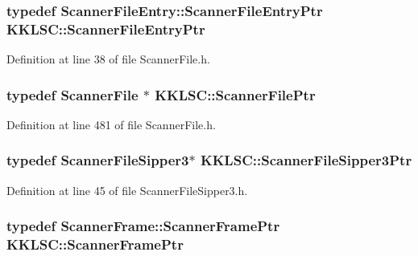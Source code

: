 \subsubsection[{\texorpdfstring{Scanner\+File\+Entry\+Ptr}{ScannerFileEntryPtr}}]{\setlength{\rightskip}{0pt plus 5cm}typedef {\bf Scanner\+File\+Entry\+::\+Scanner\+File\+Entry\+Ptr} {\bf K\+K\+L\+S\+C\+::\+Scanner\+File\+Entry\+Ptr}}\hypertarget{namespace_k_k_l_s_c_a54ff7eab3cb7195f02302b70282bfa8d}{}\label{namespace_k_k_l_s_c_a54ff7eab3cb7195f02302b70282bfa8d}


Definition at line 38 of file Scanner\+File.\+h.

\subsubsection[{\texorpdfstring{Scanner\+File\+Ptr}{ScannerFilePtr}}]{\setlength{\rightskip}{0pt plus 5cm}typedef {\bf Scanner\+File} $\ast$ {\bf K\+K\+L\+S\+C\+::\+Scanner\+File\+Ptr}}\hypertarget{namespace_k_k_l_s_c_ad33f47f76479d7fb0fc90d06fa34b581}{}\label{namespace_k_k_l_s_c_ad33f47f76479d7fb0fc90d06fa34b581}


Definition at line 481 of file Scanner\+File.\+h.

\subsubsection[{\texorpdfstring{Scanner\+File\+Sipper3\+Ptr}{ScannerFileSipper3Ptr}}]{\setlength{\rightskip}{0pt plus 5cm}typedef {\bf Scanner\+File\+Sipper3}$\ast$ {\bf K\+K\+L\+S\+C\+::\+Scanner\+File\+Sipper3\+Ptr}}\hypertarget{namespace_k_k_l_s_c_a1439b1f1a105caf8a8224c155d0e269e}{}\label{namespace_k_k_l_s_c_a1439b1f1a105caf8a8224c155d0e269e}


Definition at line 45 of file Scanner\+File\+Sipper3.\+h.

\subsubsection[{\texorpdfstring{Scanner\+Frame\+Ptr}{ScannerFramePtr}}]{\setlength{\rightskip}{0pt plus 5cm}typedef {\bf Scanner\+Frame\+::\+Scanner\+Frame\+Ptr} {\bf K\+K\+L\+S\+C\+::\+Scanner\+Frame\+Ptr}}\hypertarget{namespace_k_k_l_s_c_a5f25f724bd4774df2a6a8868024b233b}{}\label{namespace_k_k_l_s_c_a5f25f724bd4774df2a6a8868024b233b}


